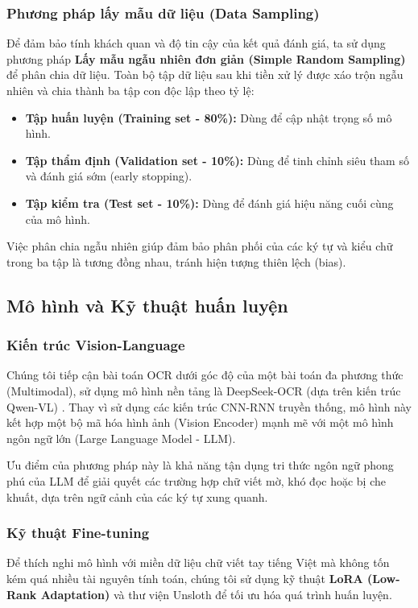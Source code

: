 \subsubsection{Phương pháp lấy mẫu dữ liệu (Data Sampling)}

Để đảm bảo tính khách quan và độ tin cậy của kết quả đánh giá, ta sử dụng phương pháp \textbf{Lấy mẫu ngẫu nhiên đơn giản (Simple Random Sampling)} để phân chia dữ liệu. Toàn bộ tập dữ liệu sau khi tiền xử lý được xáo trộn ngẫu nhiên và chia thành ba tập con độc lập theo tỷ lệ:
\begin{itemize}
    \item \textbf{Tập huấn luyện (Training set - 80\%):} Dùng để cập nhật trọng số mô hình.
    \item \textbf{Tập thẩm định (Validation set - 10\%):} Dùng để tinh chỉnh siêu tham số và đánh giá sớm (early stopping).
    \item \textbf{Tập kiểm tra (Test set - 10\%):} Dùng để đánh giá hiệu năng cuối cùng của mô hình.
\end{itemize}
Việc phân chia ngẫu nhiên giúp đảm bảo phân phối của các ký tự và kiểu chữ trong ba tập là tương đồng nhau, tránh hiện tượng thiên lệch (bias).

\subsection{Mô hình và Kỹ thuật huấn luyện}

\subsubsection{Kiến trúc Vision-Language}
Chúng tôi tiếp cận bài toán OCR dưới góc độ của một bài toán đa phương thức (Multimodal), sử dụng mô hình nền tảng là DeepSeek-OCR (dựa trên kiến trúc Qwen-VL) \cite{unsloth2025deepseek}. Thay vì sử dụng các kiến trúc CNN-RNN truyền thống, mô hình này kết hợp một bộ mã hóa hình ảnh (Vision Encoder) mạnh mẽ với một mô hình ngôn ngữ lớn (Large Language Model - LLM).

Ưu điểm của phương pháp này là khả năng tận dụng tri thức ngôn ngữ phong phú của LLM để giải quyết các trường hợp chữ viết mờ, khó đọc hoặc bị che khuất, dựa trên ngữ cảnh của các ký tự xung quanh.

\subsubsection{Kỹ thuật Fine-tuning}
Để thích nghi mô hình với miền dữ liệu chữ viết tay tiếng Việt mà không tốn kém quá nhiều tài nguyên tính toán, chúng tôi sử dụng kỹ thuật \textbf{LoRA (Low-Rank Adaptation)} và thư viện Unsloth \cite{unsloth_library} để tối ưu hóa quá trình huấn luyện.

